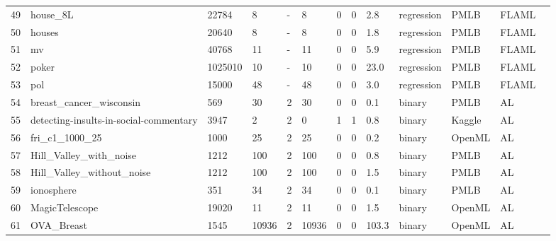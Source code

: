 \begin{table*}
\begin{tabular}{lllllllllllll}
49  & house\_8L                                   & 22784   & 8      & -     & 8     & 0      & 0         & 2.8       & regression  & PMLB   & FLAML            \\
50  & houses                                      & 20640   & 8      & -     & 8     & 0      & 0         & 1.8       & regression  & PMLB   & FLAML            \\
51  & mv                                          & 40768   & 11     & -     & 11    & 0      & 0         & 5.9       & regression  & PMLB   & FLAML            \\
52  & poker                                       & 1025010 & 10     & -     & 10    & 0      & 0         & 23.0      & regression  & PMLB   & FLAML            \\
53  & pol                                         & 15000   & 48     & -     & 48    & 0      & 0         & 3.0       & regression  & PMLB   & FLAML            \\
54  & breast\_cancer\_wisconsin                   & 569     & 30     & 2     & 30    & 0      & 0         & 0.1       & binary      & PMLB   & AL               \\
55  & detecting-insults-in-social-commentary      & 3947    & 2      & 2     & 0     & 1      & 1         & 0.8       & binary      & Kaggle & AL               \\
56  & fri\_c1\_1000\_25                           & 1000    & 25     & 2     & 25    & 0      & 0         & 0.2       & binary      & OpenML & AL               \\
57  & Hill\_Valley\_with\_noise                   & 1212    & 100    & 2     & 100   & 0      & 0         & 0.8       & binary      & PMLB   & AL               \\
58  & Hill\_Valley\_without\_noise                & 1212    & 100    & 2     & 100   & 0      & 0         & 1.5       & binary      & PMLB   & AL               \\
59  & ionosphere                                  & 351     & 34     & 2     & 34    & 0      & 0         & 0.1       & binary      & PMLB   & AL               \\
60  & MagicTelescope                              & 19020   & 11     & 2     & 11    & 0      & 0         & 1.5       & binary      & OpenML & AL               \\
61  & OVA\_Breast                                 & 1545    & 10936  & 2     & 10936 & 0      & 0         & 103.3     & binary      & OpenML & AL               \\

\end{tabular}
\end{table*}

